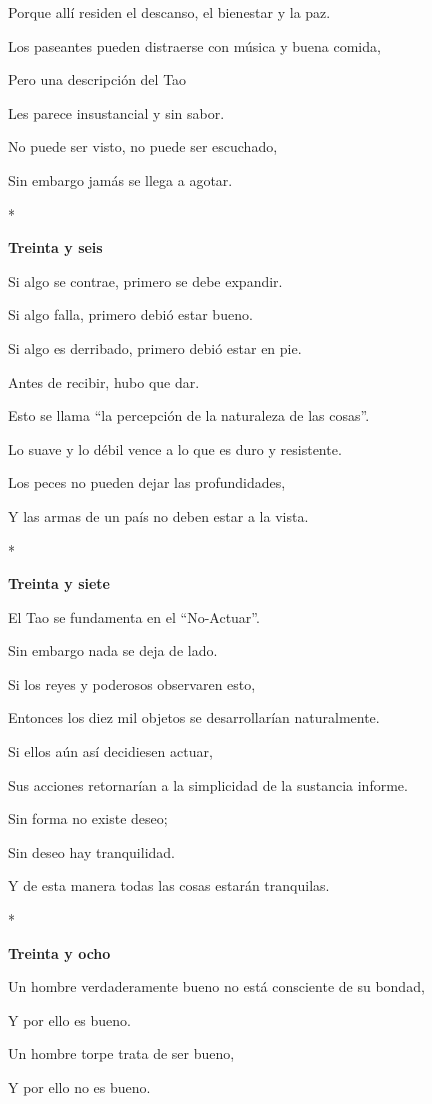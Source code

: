 Porque allí residen el descanso, el bienestar y la paz.

Los paseantes pueden distraerse con música y buena comida,

Pero una descripción del Tao

Les parece insustancial y sin sabor.

No puede ser visto, no puede ser escuchado,

Sin embargo jamás se llega a agotar.

*

\textbf{Treinta y seis}

Si algo se contrae, primero se debe expandir.

Si algo falla, primero debió estar bueno.

Si algo es derribado, primero debió estar en pie.

Antes de recibir, hubo que dar.

Esto se llama ``la percepción de la naturaleza de las cosas''.

Lo suave y lo débil vence a lo que es duro y resistente.

Los peces no pueden dejar las profundidades,

Y las armas de un país no deben estar a la vista.

*

\textbf{Treinta y siete}

El Tao se fundamenta en el ``No-Actuar''.

Sin embargo nada se deja de lado.

Si los reyes y poderosos observaren esto,

Entonces los diez mil objetos se desarrollarían naturalmente.

Si ellos aún así decidiesen actuar,

Sus acciones retornarían a la simplicidad de la sustancia informe.

Sin forma no existe deseo;

Sin deseo hay tranquilidad.

Y de esta manera todas las cosas estarán tranquilas.

*

\textbf{Treinta y ocho}

Un hombre verdaderamente bueno no está consciente de su bondad,

Y por ello es bueno.

Un hombre torpe trata de ser bueno,

Y por ello no es bueno.

